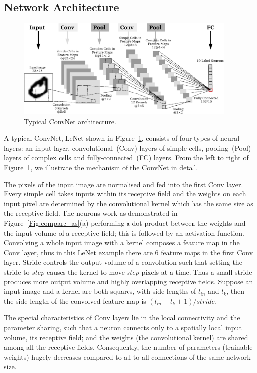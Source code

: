 \subsection{Network Architecture}

	\begin{figure}[bt]
		\centering
		\includegraphics[width=0.95\textwidth]{pics_snn/convnet.pdf}
		\caption{Typical ConvNet architecture.}
		\label{Fig:ConvNet}
	\end{figure}

A typical ConvNet, LeNet shown in Figure~\ref{Fig:ConvNet},  consists of four types of neural layers: an input layer, convolutional~(Conv) layers of simple cells, pooling~(Pool) layers of complex cells and fully-connected~(FC) layers.
From the left to right of Figure~\ref{Fig:ConvNet}, we illustrate the mechanism of the ConvNet in detail.

The pixels of the input image are normalised and fed into the first Conv layer.
Every simple cell takes inputs within its receptive field and the weights on each input pixel are determined by the convolutional kernel which has the same size as the receptive field.
The neurons work as demonstrated in Figure~\ref{Fig:compare_as}(a) performing a dot product between the weights and the input volume of a receptive field; this is followed by an activation function.
Convolving a whole input image with a kernel composes a feature map in the Conv layer, thus in this LeNet example there are 6 feature maps in the first Conv layer.
Stride controls the output volume of a convolution such that setting the stride to $step$ causes the kernel to move $step$ pixels at a time.
Thus a small stride produces more output volume and highly overlapping receptive fields.
Suppose an input image and a kernel are both squares, with side lengths of $l_{in}$ and $l_k$, then the side length of the convolved feature map is $(l_{in} - l_k + 1)/stride$.

The special characteristics of Conv layers lie in the local connectivity and the parameter sharing, such that a neuron connects only to a spatially local input volume, its receptive field; and the weights (the convolutional kernel) are shared among all the receptive fields.
Consequently, the number of parameters (trainable weights) hugely decreases compared to all-to-all connections of the same network size. 

